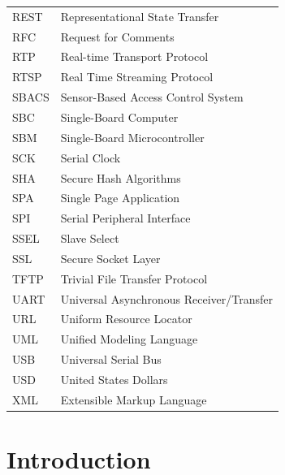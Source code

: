 \documentclass[12pt]{report}
\begin{document}
\begin{longtable}[t]{l@{\hspace*{2cm}}l}
    REST & Representational State Transfer \\
    RFC & Request for Comments \\
    RTP & Real-time Transport Protocol \\
    RTSP & Real Time Streaming Protocol \\
    SBACS & Sensor-Based Access Control System \\
    SBC & Single-Board Computer \\
    SBM & Single-Board Microcontroller \\
    SCK & Serial Clock \\
    SHA & Secure Hash Algorithms \\
    SPA & Single Page Application \\
    SPI & Serial Peripheral Interface \\
    SSEL & Slave Select \\
    SSL & Secure Socket Layer \\
    TFTP & Trivial File Transfer Protocol \\
    UART & Universal Asynchronous Receiver/Transfer \\
    URL & Uniform Resource Locator \\
    UML & Unified Modeling Language \\
    USB & Universal Serial Bus \\
    USD & United States Dollars \\
    XML & Extensible Markup Language \\
\end{longtable}


\endpreface

\setcounter{table}{0}


\chapter{Introduction} \label{introduction}

\end{document}
